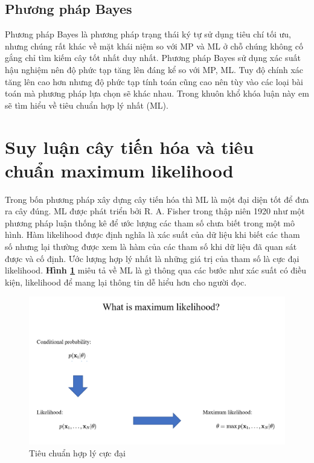 \documentclass[12pt]{report}
\begin{document}
\subsection{Phương pháp Bayes}
Phương pháp Bayes là phương pháp trạng thái ký tự sử dụng tiêu chí tối ưu, nhưng chúng rất khác về mặt khái niệm so với MP và ML ở chỗ chúng không cố gắng chỉ tìm kiếm cây tốt nhất duy nhất. Phương pháp Bayes 
sử dụng xác suất hậu nghiệm nên độ phức tạp tăng lên đáng kể so với MP, ML. Tuy độ chính xác tăng lên cao hơn nhưng độ phức tạp tính toán cũng cao nên tùy vào các loại bài toán mà phương pháp lựa chọn sẽ khác nhau. Trong khuôn khổ khóa luận này em sẽ tìm hiểu về tiêu chuẩn hợp lý nhất (ML).

\section{Suy luận cây tiến hóa và tiêu chuẩn maximum likelihood}
Trong bốn phương pháp xây dựng cây tiến hóa thì ML là một đại diện tốt để đưa ra cây đúng. ML \cite{cia-13} được phát triển  bởi R. A. Fisher trong thập niên 1920 như một phương pháp luận thống kê để ước lượng các tham số chưa biết trong một mô hình. Hàm likelihood được định nghĩa là xác suất của dữ liệu khi biết các tham số nhưng lại thường được xem là hàm của các tham số khi dữ liệu đã quan sát được và cố định. Ước lượng hợp lý nhất là những giá trị của tham số là cực đại likelihood. \textbf{Hình \ref{fig:image2.1}} miêu tả về ML là gì thông qua các bước như xác suất có điều kiện, likelihood để mang lại thông tin dễ hiểu hơn cho người đọc.

\begin{figure}[h]
	\centering
	\includegraphics[scale=0.5]{Image/2.1.png}
	\caption{Tiêu chuẩn hợp lý cực đại}
	\label{fig:image2.1}
\end{figure}
\end{document}
